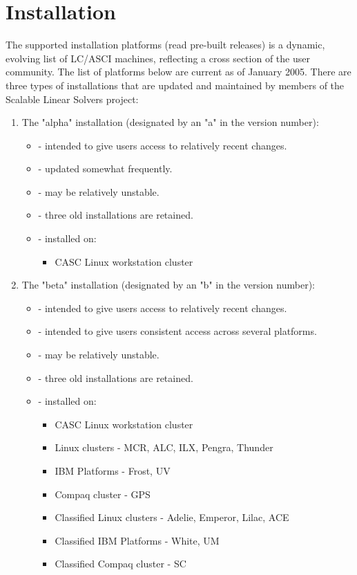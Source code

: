 \chapter{Installation}
\label{Installation}

The supported installation platforms (read pre-built \hypre{} releases)
is a dynamic, evolving list of LC/ASCI machines, reflecting a cross
section of the \hypre{} user community.  The list of platforms below are
current as of January 2005.
There are three types of \hypre{} installations that are updated and
maintained by members of the Scalable Linear Solvers project:
\begin{enumerate}

\item The "alpha" installation (designated by an "a" in the version number):
   \begin{itemize}
   \item - intended to give users access to relatively recent changes.
   \item - updated somewhat frequently.
   \item - may be relatively unstable.
   \item - three old installations are retained.
   \item - installed on:
      \begin{itemize}
      \item CASC Linux workstation cluster
      \end{itemize}
   \end{itemize}

\item The "beta" installation (designated by an "b" in the version number):
   \begin{itemize}
   \item - intended to give users access to relatively recent changes.
   \item - intended to give users consistent access across several platforms.
   \item - may be relatively unstable.
   \item - three old installations are retained.
   \item - installed on:
      \begin{itemize}
       \item CASC Linux workstation cluster
       \item Linux clusters - MCR, ALC, ILX, Pengra, Thunder
       \item IBM Platforms - Frost, UV
       \item Compaq cluster - GPS
       \item Classified Linux clusters - Adelie, Emperor, Lilac, ACE
       \item Classified IBM Platforms - White, UM
       \item Classified Compaq cluster - SC
      \end{itemize}
   \end{itemize}


\end{enumerate}
